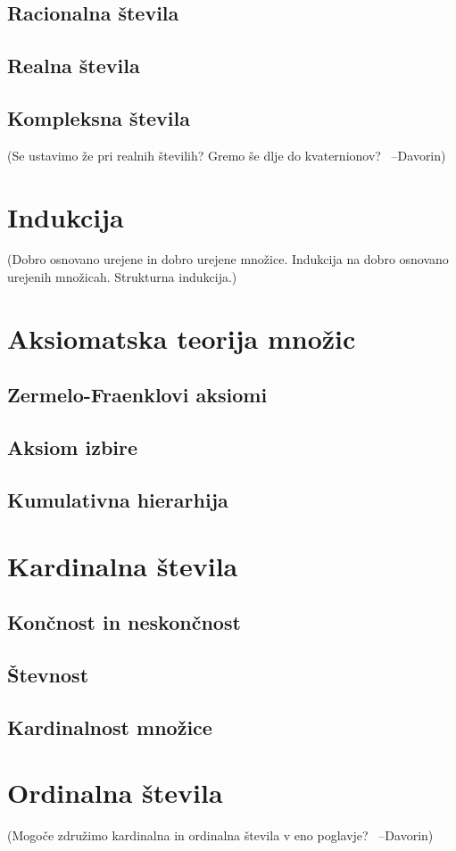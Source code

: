 \documentclass[11pt,a4paper,twoside]{book}
\newcommand{\davorin}[1]{{\small\textcolor{davorincolor}{(#1 \ \mbox{--Davorin})}}}
\newcommand{\note}[1]{{\small\textcolor{notecolor}{(#1)}}}
\begin{document}
                \section{Racionalna števila}
                \section{Realna števila}
                \section{Kompleksna števila}
                        \davorin{Se ustavimo že pri realnih številih? Gremo še dlje do kvaternionov?}

        \chapter{Indukcija}
                \note{Dobro osnovano urejene in dobro urejene množice. Indukcija na dobro osnovano urejenih množicah. Strukturna indukcija.}

        \chapter{Aksiomatska teorija množic}
                \section{Zermelo-Fraenklovi aksiomi}
                \section{Aksiom izbire}
                \section{Kumulativna hierarhija}

        \chapter{Kardinalna števila}
                \section{Končnost in neskončnost}
                \section{Števnost}
                \section{Kardinalnost množice}

        \chapter{Ordinalna števila}
                \davorin{Mogoče združimo kardinalna in ordinalna števila v eno poglavje?}
\end{document}
